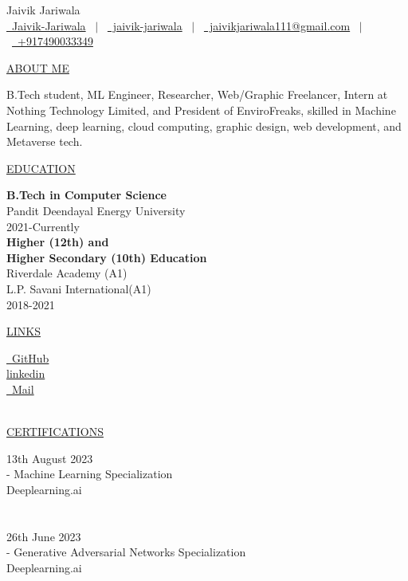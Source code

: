 \documentclass[11pt]{article}
\newcommand{\resumetitle}[3]{
    \AddToShipoutPictureBG{
        \AtPageUpperLeft {
        \raisebox{-0.09\paperheight}{
            \color{black!85}\rule{2\paperwidth}{\paperheight}}
        }}
    \begin{Center}
        \begingroup
        \titlethin
        \color{black!10}\Huge{#1}
        \titlethick
        \color{black!5}\Huge{#2} \\
        \vspace{2mm}
        \textrm{\color{black!15}\Large{#3}}
        \endgroup
    \end{Center}
    \vspace{7mm}
}
\newcommand{\betteruline}[1]{
    \uline{#1}
}
\newcommand{\sectiontitle}[1]{
    \begingroup
        \titlebold
        \betteruline{\Large\uppercase{#1}  }
        \vspace{1.7mm}
    \endgroup
}
\newcommand{\sectioncontent}[1]{
    \begingroup
        \begin{FlushLeft}
        \vspace{-3mm}
        \sffamily\small#1
        \end{FlushLeft}
    \endgroup
    \vspace{2mm}
}
\newcommand{\honor}[2]{
    \textcolor{black!70}{#1} - #2 \\
    \vspace{1.5mm}
}
\begin{document}
    \resumetitle{Jaivik}{Jariwala} {
        \href{https://github.com/Jaivik-Jariwala}{\raisebox{-0.05\height}\faGithub\ Jaivik-Jariwala} \ $|$ \ 
        \href{https://linkedin.com/in/jaivik-jariwala}{\raisebox{-0.05\height}\faLinkedin\ jaivik-jariwala} \ $|$ \ 
        \href{mailto:jaivikjariwala111@gmail.com}{\raisebox{-0.05\height}\faEnvelope \ jaivikjariwala111@gmail.com} \ $|$ \ 
        \href{tel:+917490033349}{\raisebox{-0.05\height}\faMobile \ +917490033349} \\
        }

    \columnratio{0.31}
    \setlength{\columnsep}{7mm}
    \begin{paracol}{2}

    \sectiontitle{about me}
    \sectioncontent{
        B.Tech student, ML Engineer, Researcher, Web/Graphic Freelancer, Intern at Nothing Technology Limited, and President of EnviroFreaks, skilled in Machine Learning, deep learning, cloud computing, graphic design, web development, and Metaverse tech.
    }

    \sectiontitle{education}
    \sectioncontent{
        \textbf{B.Tech in Computer Science} \\
        Pandit Deendayal Energy University \\
        \textcolor{black!70}{2021-Currently} \\
        \vspace{2mm}
        \textbf{Higher (12th) and \\
        Higher Secondary (10th) Education } \\
        Riverdale Academy (A1)\\
        L.P. Savani International(A1)\\
        \textcolor{black!70}{2018-2021} \\
    }

    \sectiontitle{links}
    \sectioncontent{
        \href{https://github.com/Jaivik-Jariwala}{\raisebox{-0.05\height}\faGithub\ GitHub} \hspace{2.1mm} \\
        \faIcon{linkedin}
        \href{https://linkedin.com/in/jaivik-jariwala}{linkedin} \\
        \href{mailto:jaivikjariwala111@gmail.com}{\raisebox{-0.05\height}\faEnvelope \ Mail} \\\
    }

    \sectiontitle{Certifications}
    \sectioncontent{
        \honor{13th August 2023\\}{Machine Learning Specialization \\ Deeplearning.ai}\\
        \\
        \honor{26th June 2023\\}{Generative Adversarial Networks Specialization \\ Deeplearning.ai}\\
    }


\end{paracol}
\end{document}
